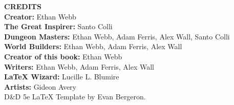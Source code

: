 
  
\begin{twocolumn}
\setlength{\leftskip}{2em}
\setlength{\parindent}{-2em}

\textbf{\large CREDITS} \\
\bigskip
\textbf{Creator:} Ethan Webb \\
\bigskip
\textbf{The Great Inspirer:} Santo Colli \\
\bigskip
\textbf{Dungeon Masters:} Ethan Webb, Adam Ferris, Alex Wall, Santo Colli \\
\bigskip
\textbf{World Builders:} Ethan Webb, Adam Ferris, Alex Wall \\
\bigskip
\textbf{Creator of this book:} Ethan Webb \\
\bigskip
\textbf{Writers:} Ethan Webb, Adam Ferris, Alex Wall \\
\bigskip
\textbf{\LaTeX{} Wizard:} Lucille L. Blumire \\
\bigskip
\textbf{Artists:} Gideon Avery \\
\bigskip
D\&D 5e LaTeX Template by Evan Bergeron. \\
\end{twocolumn}